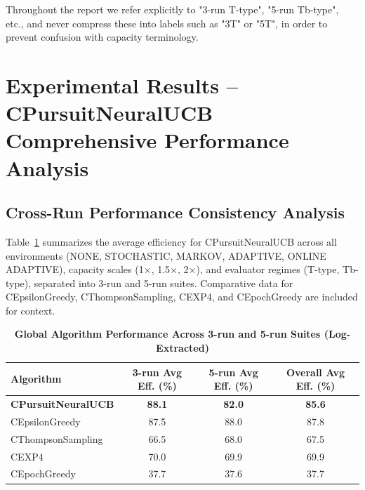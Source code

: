 \documentclass[12pt,a4paper]{article}
\newcommand{\performance}[1]{\textcolor{performancecolor}{\textbf{#1}}}
\begin{document}
Throughout the report we refer explicitly to "3-run T-type", "5-run Tb-type", etc., and never compress these into labels such as "3T" or "5T", in order to prevent confusion with capacity terminology.

\newpage
\section{Experimental Results – CPursuitNeuralUCB Comprehensive Performance Analysis}

\begin{tcolorbox}[colback=performancecolor!10,colframe=performancecolor,title=\textbf{Primary Performance Results (CPursuitNeuralUCB Aggregated Across Capacities, Environments, and Regimes)}]

\subsection{Cross-Run Performance Consistency Analysis}

Table~\ref{tab:global-performance} summarizes the average efficiency for CPursuitNeuralUCB across all environments (NONE, STOCHASTIC, MARKOV, ADAPTIVE, ONLINE ADAPTIVE), capacity scales (1$\times$, 1.5$\times$, 2$\times$), and evaluator regimes (T-type, Tb-type), separated into 3-run and 5-run suites. Comparative data for CEpsilonGreedy, CThompsonSampling, CEXP4, and CEpochGreedy are included for context.

\begin{table}[H]
\centering
\caption{\performance{Global Algorithm Performance Across 3-run and 5-run Suites (Log-Extracted)}}
\label{tab:global-performance}
\begin{tabular}{|l|c|c|c|}
\hline
\textbf{Algorithm} & \textbf{3-run Avg Eff. (\%)} & \textbf{5-run Avg Eff. (\%)} & \textbf{Overall Avg Eff. (\%)} \\
\hline
\hline
\performance{CPursuitNeuralUCB}  & \performance{88.1} & \performance{82.0} & \performance{\textbf{85.6}} \\
CEpsilonGreedy                   & 87.5              & 88.0              & 87.8 \\
CThompsonSampling                & 66.5              & 68.0              & 67.5 \\
CEXP4                            & 70.0              & 69.9              & 69.9 \\
CEpochGreedy                     & 37.7              & 37.6              & 37.7 \\
\hline
\end{tabular}
\end{table}


\end{tcolorbox}
\end{document}
